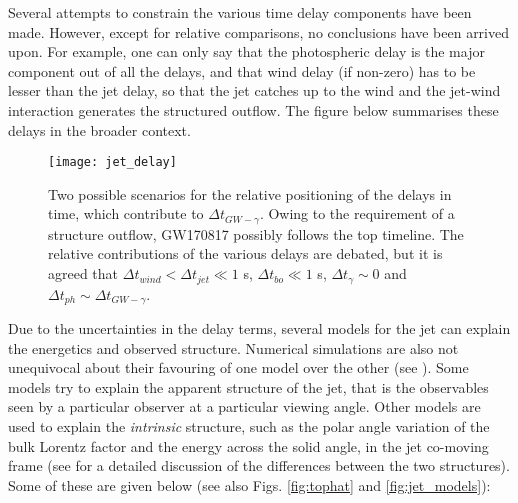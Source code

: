     Several attempts to constrain the various time delay components have been
    made. However, except for relative comparisons, no conclusions have been
    arrived upon.  For example, one can only say that the photospheric delay is
    the major component out of all the delays, and that wind delay (if non-zero)
    has to be lesser than the jet delay, so that the jet catches up to the wind
    and the jet-wind interaction generates the structured outflow. The figure
    below summarises these delays in the broader context.

    \begin{figure}[H]
        \label{fig:jet_delay}
        \centering
        \texttt{[image: jet\_delay]}
        \caption[Relative Positions of Jet Delays]{
                    Two possible scenarios for the relative positioning of the
                    delays in time, which contribute to $\Delta t_{GW-\gamma}$.
                    Owing to the requirement of a structure outflow, GW170817
                    possibly follows the top timeline. The relative
                    contributions of the various delays are debated, but it is
                    agreed that $\Delta t_{wind} < \Delta t_{jet} \ll 1$ s,
                    $\Delta t_{bo} \ll 1$ s, $\Delta t_{\gamma} \sim 0$ and
                    $\Delta t_{ph} \sim \Delta t_{GW-\gamma}$.
             }
    \end{figure}

    Due to the uncertainties in the delay terms, several models for the jet can
    explain the energetics and observed structure. Numerical simulations are
    also not unequivocal about their favouring of one model over the other (see
    \cite{shibata_merger_2019}). Some models try to explain the apparent
    structure of the jet, that is the observables seen by a particular observer
    at a particular viewing angle. Other models are used to explain the
    \textit{intrinsic} structure, such as the polar angle variation of the bulk
    Lorentz factor and the energy across the solid angle, in the jet co-moving
    frame (see \cite{salafia_structure_2015} for a detailed discussion of the
    differences between the two structures). Some of these are given below (see
    also Figs. \ref{fig:tophat} and \ref{fig:jet_models}):

